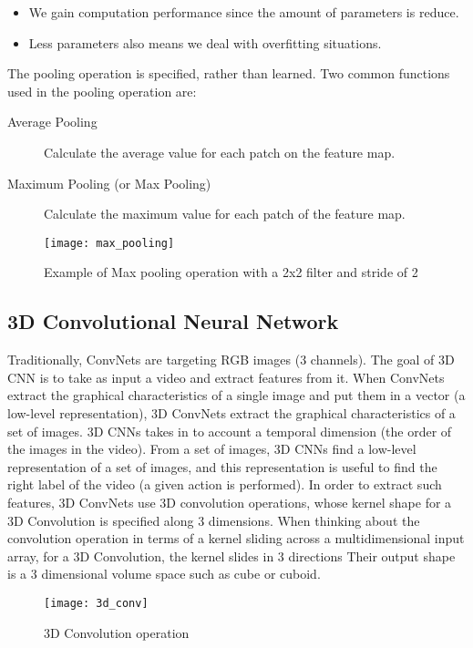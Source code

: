 \begin{itemize}
\item We gain computation performance since the amount of parameters is reduce.
\item Less parameters also means we deal with overfitting situations.
\end{itemize}

The pooling operation is specified, rather than learned. Two common functions used in the pooling operation are:
\begin{description}
\item[ Average Pooling ] Calculate the average value for each patch on the feature map.
\item[ Maximum Pooling (or Max Pooling) ] Calculate the maximum value for each patch of the feature map.
\end{description}

\begin{figure}[h]
  \centering
  \texttt{[image: max\_pooling]}
  \caption{Example of Max pooling operation with a 2x2 filter  and stride of 2}
  \label{fig:pooling_eg}
\end{figure}

\subsection{3D Convolutional Neural Network}
Traditionally, ConvNets are targeting RGB images (3 channels). The goal of 3D CNN is to take as input a video and extract features from it.
When ConvNets extract the graphical characteristics of a single image and put them in a vector (a low-level representation), 3D ConvNets
extract the graphical characteristics of a set of images. 3D CNNs takes in to account a temporal dimension (the order of the images in the
video). From a set of images, 3D CNNs find a low-level representation of a set of images, and this representation is useful to find the
right label of the video (a given action is performed). In order to extract such features, 3D ConvNets  use 3D convolution operations, whose kernel
shape for a 3D Convolution is specified along 3 dimensions. When thinking about the convolution operation in terms of a kernel sliding
across a multidimensional input array, for a 3D Convolution, the kernel slides in 3 directions
Their output shape is a 3 dimensional volume space such as cube or cuboid.

\begin{figure}[h]
  \centering
  \texttt{[image: 3d\_conv]}
  \caption{3D Convolution operation}
\end{figure}

